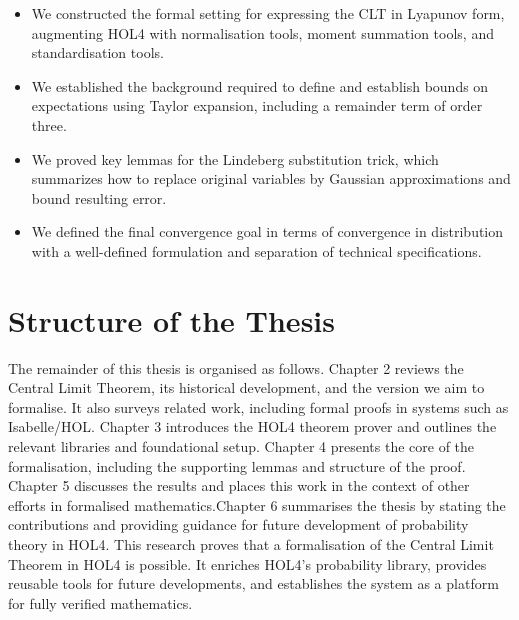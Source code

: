 \begin{itemize}
\item We constructed the formal setting for expressing the CLT in Lyapunov form, augmenting HOL4 with normalisation tools, moment summation tools, and standardisation tools.
\item We established the background required to define and establish bounds on expectations using Taylor expansion, including a remainder term of order three.
\item We proved key lemmas for the Lindeberg substitution trick, which summarizes how to replace original variables by Gaussian approximations and bound resulting error.
\item We defined the final convergence goal in terms of convergence in distribution with a well-defined formulation and separation of technical specifications.
\end{itemize}

\section{Structure of the Thesis}
The remainder of this thesis is organised as follows. Chapter 2 reviews the Central Limit Theorem, its historical development, and the version we aim to formalise. It also surveys related work, including formal proofs in systems such as Isabelle/HOL. Chapter 3 introduces the HOL4 theorem prover and outlines the relevant libraries and foundational setup. Chapter 4 presents the core of the formalisation, including the supporting lemmas and structure of the proof. Chapter 5 discusses the results and places this work in the context of other efforts in formalised mathematics.Chapter 6 summarises the thesis by stating the contributions and providing guidance for future development of probability theory in HOL4. This research proves that a formalisation of the Central Limit Theorem in HOL4 is possible. It enriches HOL4's probability library, provides reusable tools for future developments, and establishes the system as a platform for fully verified mathematics.
